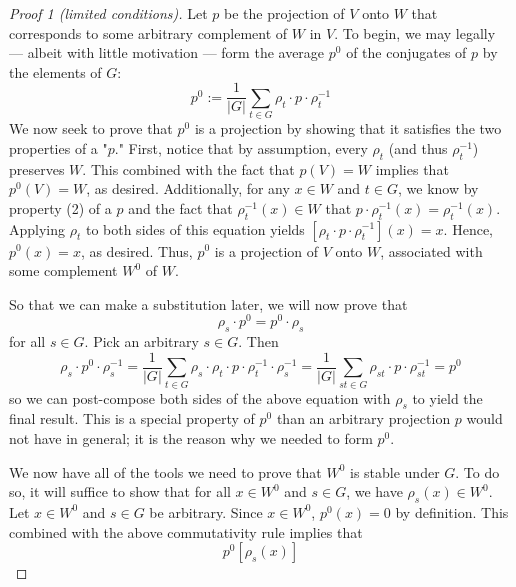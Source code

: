 \documentclass[../notes.tex]{subfiles}
\begin{document}
\begin{itemize}
\begin{theorem}
\begin{proof}[Proof 1 (limited conditions)]
            Let $p$ be the projection of $V$ onto $W$ that corresponds to some arbitrary complement of $W$ in $V$. To begin, we may legally --- albeit with little motivation --- form the average $p^0$ of the conjugates of $p$ by the elements of $G$:
            \begin{equation*}
                p^0 := \frac{1}{|G|}\sum_{t\in G}\rho_t\cdot p\cdot\rho_t^{-1}
            \end{equation*}
            We now seek to prove that $p^0$ is a projection by showing that it satisfies the two properties of a "$p$." First, notice that by assumption, every $\rho_t$ (and thus $\rho_t^{-1}$) preserves $W$. This combined with the fact that $p(V)=W$ implies that $p^0(V)=W$, as desired. Additionally, for any $x\in W$ and $t\in G$, we know by property (2) of a $p$ and the fact that $\rho_t^{-1}(x)\in W$ that $p\cdot\rho_t^{-1}(x)=\rho_t^{-1}(x)$. Applying $\rho_t$ to both sides of this equation yields $[\rho_t\cdot p\cdot\rho_t^{-1}](x)=x$. Hence, $p^0(x)=x$, as desired. Thus, $p^0$ is a projection of $V$ onto $W$, associated with some complement $W^0$ of $W$.\par
            So that we can make a substitution later, we will now prove that
            \begin{equation*}
                \rho_s\cdot p^0 = p^0\cdot\rho_s
            \end{equation*}
            for all $s\in G$. Pick an arbitrary $s\in G$. Then
            \begin{equation*}
                \rho_s\cdot p^0\cdot\rho_s^{-1} = \frac{1}{|G|}\sum_{t\in G}\rho_s\cdot\rho_t\cdot p\cdot\rho_t^{-1}\cdot\rho_s^{-1}
                = \frac{1}{|G|}\sum_{st\in G}\rho_{st}\cdot p\cdot\rho_{st}^{-1}
                = p^0
            \end{equation*}
            so we can post-compose both sides of the above equation with $\rho_s$ to yield the final result. This is a special property of $p^0$ than an arbitrary projection $p$ would not have in general; it is the reason why we needed to form $p^0$.\par
            We now have all of the tools we need to prove that $W^0$ is stable under $G$. To do so, it will suffice to show that for all $x\in W^0$ and $s\in G$, we have $\rho_s(x)\in W^0$. Let $x\in W^0$ and $s\in G$ be arbitrary. Since $x\in W^0$, $p^0(x)=0$ by definition. This combined with the above commutativity rule implies that
            \begin{equation*}
                p^0[\rho_s(x)] 

\end{equation*}
\end{proof}
\end{theorem}
\end{itemize}
\end{document}
